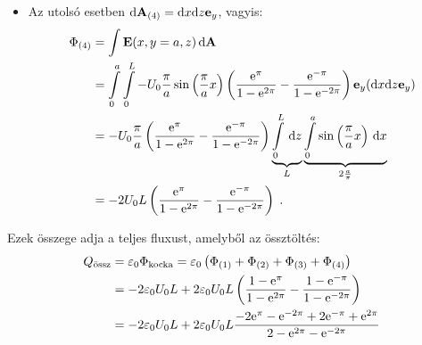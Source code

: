 \begin{itemize}
 \item
  Az utolsó esetben $\mathrm{d}\mathbf{A}_{(4)}=\mathrm{d} x\mathrm{d} z \mathbf{e}_y$, vagyis:
  \begin{align}
   \Phi_{(4)}
    &=
     \int \mathbf{E}(x,y=a,z)\,\mathrm{d}\mathbf{A}
   \\
    &=
     \int\limits_{0}^{a}\int\limits_{0}^{L} -U_0\frac{\pi}{a} \sin\left(\frac{\pi}{a}x\right) \left(\frac{\mathrm{e}^\pi}{1-\mathrm{e}^{2\pi}} - \frac{\mathrm{e}^{-\pi}}{1-\mathrm{e}^{-2\pi}}\right) \mathbf{e}_y (\mathrm{d}x\mathrm{d}z\mathbf{e}_y) 
   \\
    &=
     -U_0\frac{\pi}{a} \left(\frac{\mathrm{e}^\pi}{1-\mathrm{e}^{2\pi}} - \frac{\mathrm{e}^{-\pi}}{1-\mathrm{e}^{-2\pi}}\right) 
      \underbrace{\int\limits_{0}^{L}\,\mathrm{d}z}_{L} 
      \underbrace{\int\limits_{0}^{a}\sin\left(\frac{\pi}{a}x\right)\,\mathrm{d}x}_{2\frac{a}{\pi}} 
   \\
    &= 
     -2U_0L  \left(\frac{\mathrm{e}^\pi}{1-\mathrm{e}^{2\pi}} - \frac{\mathrm{e}^{-\pi}}{1-\mathrm{e}^{-2\pi}}\right)\;. 
  \end{align}

\end{itemize}

Ezek összege adja a teljes fluxust, amelyből az össztöltés:
\begin{align}
 Q_\textrm{össz}
  &=
    \varepsilon_0\Phi_\text{kocka}
   =\varepsilon_0 \left(\Phi_{(1)}+\Phi_{(2)}+\Phi_{(3)}+\Phi_{(4)}\right) 
 \\
  &=-2\varepsilon_0 U_0 L 
    +2\varepsilon_0 U_0 L\left(\frac{1-\mathrm{e}^\pi}{1-\mathrm{e}^{2\pi}}-\frac{1-\mathrm{e}^{-\pi}}{1-\mathrm{e}^{-2\pi}}\right)
 \\
  &=-2\varepsilon_0 U_0 L 
    +2\varepsilon_0 U_0 L\frac{-2\mathrm{e}^\pi-\mathrm{e}^{-2\pi}+2\mathrm{e}^{-\pi}+\mathrm{e}^{2\pi}}{2-\mathrm{e}^{2\pi}-\mathrm{e}^{-2\pi}}
\end{align}


\fi